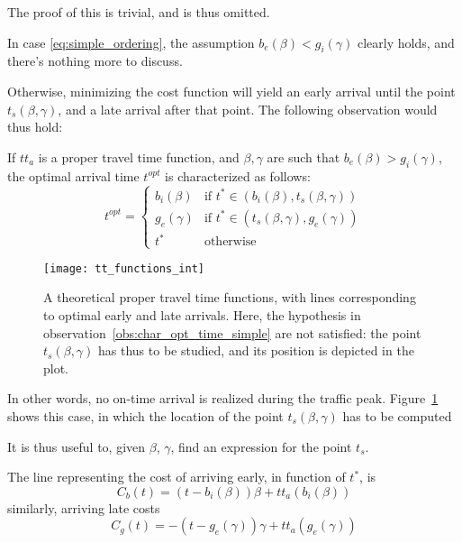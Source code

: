 The proof of this is trivial, and is thus omitted.

In case \eqref{eq:simple_ordering}, the assumption \(b_e(\beta) < g_i(\gamma)\) clearly holds, and there's nothing more to discuss.

Otherwise, minimizing the cost function will yield an early arrival until the point \(t_s(\beta, \gamma)\), and a late arrival after that point.
The following observation would thus hold:
\begin{obs}
  \label{obs:char_opt_time_comp}
  If \(tt_a\) is a proper travel time function, and \(\beta, \gamma\) are such that \(b_e(\beta) > g_i(\gamma)\), the optimal arrival time \(t^{opt}\) is characterized as follows:
  \begin{equation}
    t^{opt} =
    \begin{cases}
      b_i(\beta) & \text{if } t^*\in(b_i(\beta), t_s(\beta, \gamma)) \\
      g_e(\gamma) & \text{if } t^*\in(t_s(\beta, \gamma), g_e(\gamma)) \\
      t^* & \text{otherwise}
    \end{cases}
  \end{equation}
\end{obs}

\begin{figure}
  \centering
  \texttt{[image: tt\_functions\_int]}
  \caption{A theoretical proper travel time functions, with lines corresponding to optimal early and late arrivals.
    Here, the hypothesis in observation~\ref{obs:char_opt_time_simple} are not satisfied:
    the point \(t_s(\beta, \gamma)\) has thus to be studied,
  and its position is depicted in the plot.}
  \label{fig:tt_functions_int}
\end{figure}

In other words, no on-time arrival is realized during the traffic peak.
Figure~\ref{fig:tt_functions_int} shows this case, in which the location of the point \(t_s(\beta, \gamma)\) has to be computed

It is thus useful to, given \(\beta\), \(\gamma\), find an expression for the point \(t_s\).

The line representing the cost of arriving early, in function of \(t^*\), is
\begin{equation*}
  C_b(t) = (t - b_i(\beta))\beta + tt_a(b_i(\beta))
\end{equation*}
similarly, arriving late costs
\begin{equation*}
  C_g(t) = -(t - g_e(\gamma))\gamma + tt_a(g_e(\gamma))
\end{equation*}

